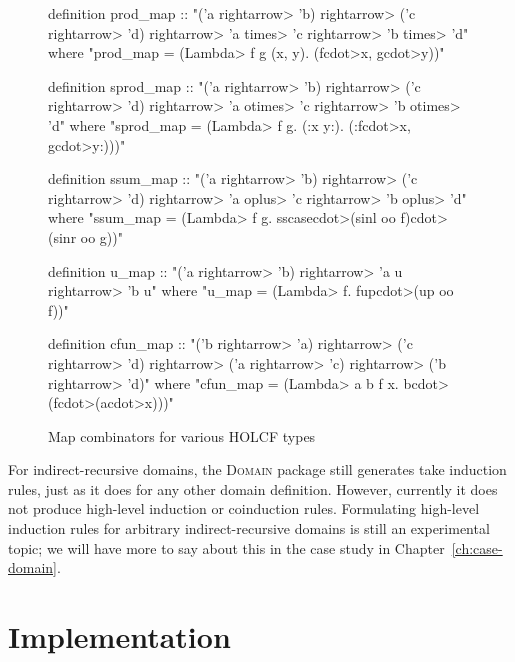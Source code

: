 \begin{figure}
\begin{isacode}
definition prod_map :: "('a \<rightarrow> 'b) \<rightarrow> ('c \<rightarrow> 'd) \<rightarrow> 'a \<times> 'c \<rightarrow> 'b \<times> 'd"
  where "prod_map = (\<Lambda> f g (x, y). (f\<cdot>x, g\<cdot>y))"
\end{isacode}
\unmedskip
{}
\begin{isacode}
definition sprod_map :: "('a \<rightarrow> 'b) \<rightarrow> ('c \<rightarrow> 'd) \<rightarrow> 'a \<otimes> 'c \<rightarrow> 'b \<otimes> 'd"
  where "sprod_map = (\<Lambda> f g. (:x y:). (:f\<cdot>x, g\<cdot>y:)))"
\end{isacode}
\unmedskip
{}
\begin{isacode}
definition ssum_map :: "('a \<rightarrow> 'b) \<rightarrow> ('c \<rightarrow> 'd) \<rightarrow> 'a \<oplus> 'c \<rightarrow> 'b \<oplus> 'd"
  where "ssum_map = (\<Lambda> f g. sscase\<cdot>(sinl oo f)\<cdot>(sinr oo g))"
\end{isacode}
\unmedskip
{}
\begin{isacode}
definition u_map :: "('a \<rightarrow> 'b) \<rightarrow> 'a u \<rightarrow> 'b u"
  where "u_map = (\<Lambda> f. fup\<cdot>(up oo f))"
\end{isacode}
\unmedskip
{}
\begin{isacode}
definition cfun_map :: "('b \<rightarrow> 'a) \<rightarrow> ('c \<rightarrow> 'd) \<rightarrow> ('a \<rightarrow> 'c) \<rightarrow> ('b \<rightarrow> 'd)"
  where "cfun_map = (\<Lambda> a b f x. b\<cdot>(f\<cdot>(a\<cdot>x)))"
\end{isacode}
\caption{Map combinators for various HOLCF types}
\label{fig:domain-map-combinators}
\end{figure}

For indirect-recursive domains, the \textsc{Domain} package still generates take induction rules, just as it does for any other domain definition. However, currently it does not produce high-level induction or coinduction rules. Formulating high-level induction rules for arbitrary indirect-recursive domains is still an experimental topic; we will have more to say about this in the case study in Chapter~\ref{ch:case-domain}.


\section{Implementation}
\label{sec:domain-implementation}

